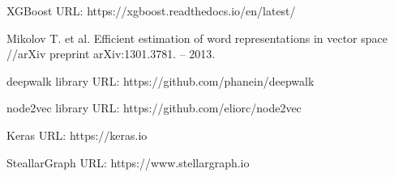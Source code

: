 \begin{thebibliography}{9}
XGBoost URL: https://xgboost.readthedocs.io/en/latest/

Mikolov T. et al. Efficient estimation of word representations in vector space //arXiv preprint arXiv:1301.3781. – 2013.

deepwalk library URL: https://github.com/phanein/deepwalk

node2vec library URL: https://github.com/eliorc/node2vec

Keras URL: https://keras.io

SteallarGraph URL: https://www.stellargraph.io

\end{thebibliography}
\endgroup

\clearpage